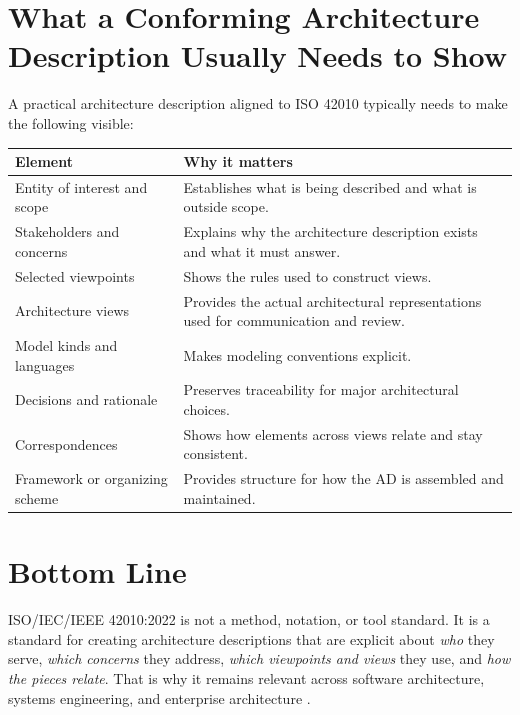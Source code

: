 \documentclass[11pt]{article}
\begin{document}
\section*{What a Conforming Architecture Description Usually Needs to Show}
A practical architecture description aligned to ISO 42010 typically needs to make the following visible:

\begin{center}
\renewcommand{\arraystretch}{1.2}
\begin{tabularx}{\textwidth}{>{\raggedright\arraybackslash}p{} X}
\toprule
\textbf{Element} & \textbf{Why it matters} \\
\midrule
Entity of interest and scope & Establishes what is being described and what is outside scope. \\
Stakeholders and concerns & Explains why the architecture description exists and what it must answer. \\
Selected viewpoints & Shows the rules used to construct views. \\
Architecture views & Provides the actual architectural representations used for communication and review. \\
Model kinds and languages & Makes modeling conventions explicit. \\
Decisions and rationale & Preserves traceability for major architectural choices. \\
Correspondences & Shows how elements across views relate and stay consistent. \\
Framework or organizing scheme & Provides structure for how the AD is assembled and maintained. \\
\bottomrule
\end{tabularx}
\end{center}

\section*{Bottom Line}
ISO/IEC/IEEE 42010:2022 is not a method, notation, or tool standard. It is a standard for creating architecture descriptions that are explicit about \emph{who} they serve, \emph{which concerns} they address, \emph{which viewpoints and views} they use, and \emph{how the pieces relate}. That is why it remains relevant across software architecture, systems engineering, and enterprise architecture \cite{iso42010,cm42010}.
\end{document}
